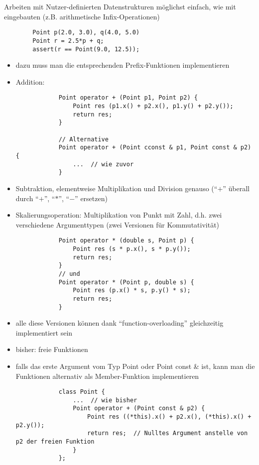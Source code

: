 \documentclass{article}
\begin{document}
Arbeiten mit Nutzer-definierten Datenstrukturen möglichst einfach, wie mit eingebauten (z.B. arithmetische Infix-Operationen)
	\begin{lstlisting}
		Point p(2.0, 3.0), q(4.0, 5.0)
		Point r = 2.5*p + q;
		assert(r == Point(9.0, 12.5));
	\end{lstlisting}
	\begin{itemize}
		\item dazu muss man die entsprechenden Prefix-Funktionen implementieren 
		\item Addition:
		\begin{lstlisting}
			Point operator + (Point p1, Point p2) {
				Point res (p1.x() + p2.x(), p1.y() + p2.y());
				return res;
			}

			// Alternative
			Point operator + (Point cconst & p1, Point const & p2) {
				...  // wie zuvor
			}
		\end{lstlisting} 
		\item Subtraktion, elementweise Multiplikation und Division genauso (``$+$'' überall durch ``$+$'', ``$*$'', ``$-$'' ersetzen)
		\item Skalierungsoperation: Multiplikation von Punkt mit Zahl, d.h. zwei verschiedene Argumenttypen (zwei Versionen für Kommutativität)
		\begin{lstlisting}
			Point operator * (double s, Point p) {
				Point res (s * p.x(), s * p.y());
				return res;
			}
			// und 
			Point operator * (Point p, double s) {
				Point res (p.x() * s, p.y() * s);
				return res;
			}
		\end{lstlisting}
		\item alle diese Versionen können dank ``function-overloading'' gleichzeitig implementiert sein
		\item bisher: freie Funktionen
		\item falls das erste Argument vom Typ Point oder Point const \& ist, kann man die Funktionen alternativ als Member-Funktion implementieren
		\begin{lstlisting}
			class Point {
				...  // wie bisher
				Point operator + (Point const & p2) {
					Point res ((*this).x() + p2.x(), (*this).x() + p2.y());
					return res;  // Nulltes Argument anstelle von p2 der freien Funktion
				}
			};
		\end{lstlisting}
	\end{itemize}
\end{document}
